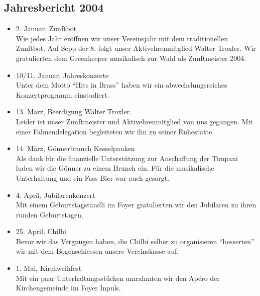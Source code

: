 \subsection{Jahresbericht 2004}

\begin{history}


    \begin{itemize}

        \item[]2. Januar, Zunftbot\\
        Wie jedes Jahr eröffnen wir unser Vereinsjahr mit dem traditionellen
        Zunftbot. Auf Sepp der 8. folgt unser Aktivehrenmitglied Walter Troxler.
        Wir gratulierten dem Greenkeeper musikalisch zur Wahl als Zunftmeister
        2004.

        \item[]10/11. Januar, Jahreskonzerte\\
        Unter dem Motto \enquote{Hits in Brass} haben wir ein
        abwechslungsreiches Konzertprogramm einstudiert.

        \item[]13. März, Beerdigung Walter Troxler.\\
        Leider ist unser Zunftmeister und Aktivehrenmitglied von uns gegangen.
        Mit einer Fahnendelegation begleiteten wir ihn zu seiner Ruhestätte.

        \item[]14. März, Gönnerbrunch Kesselpauken\\
        Als dank für die finanzielle Unterstützung zur Anschaffung der Timpani
        luden wir die Gönner zu einem Brunch ein. Für die musikalische
        Unterhaltung und ein Fass Bier war auch gesorgt.

        \item[]4. April, Jubilarenkonzert\\
        Mit einem Geburtstagständli im Foyer gratulierten wir den Jubilaren zu
        ihren runden Geburtstagen.

        \item[]25. April, Chilbi\\
        Bevor wir das Vergnügen haben, die Chilbi selber zu organisieren
        \enquote{besserten} wir mit dem Bogenschiessen unsere Vereinskasse auf.

        \item[]1. Mai, Kirchweihfest\\
        Mit ein paar Unterhaltungsstücken umrahmten wir den Apéro
        der Kirchengemeinde im Foyer Inpuls.


\end{itemize}
\end{history}
